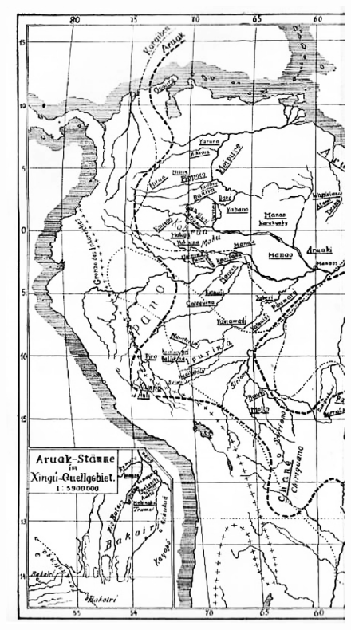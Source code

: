 \begin{figure}[H]
\begin{absolutelynopagebreak}
  \hspace{2cm}
  \includegraphics[width=\textwidth]{./MAPA_P1.pdf}  

\end{absolutelynopagebreak}
\end{figure}


